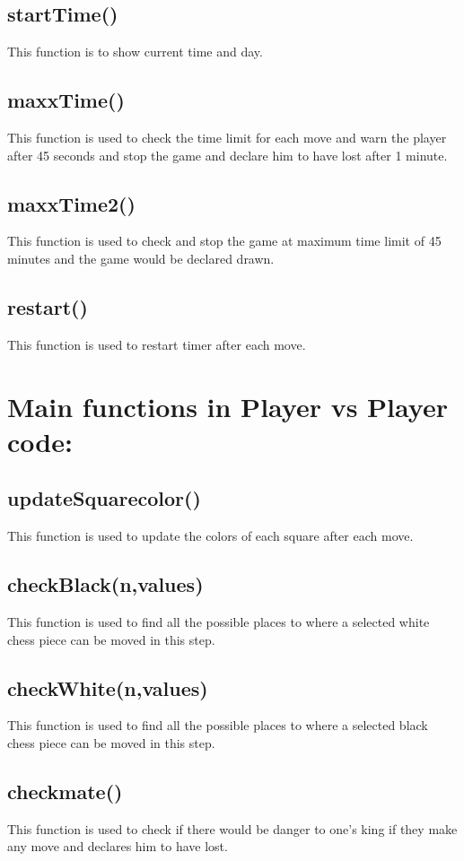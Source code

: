 \documentclass{article}
\begin{document}
\subsection{startTime()}
This function is to show current time and day.
\subsection{maxxTime()}This function is used to check the time limit for each move and warn the player after 45 seconds and stop the game and declare him to have lost after 1 minute.
\subsection{maxxTime2()}This function is used to check and stop the game at maximum time limit of 45 minutes and the game would be declared drawn.
\subsection{restart()}This function is used to restart timer after each move. \\





\section{Main functions in Player vs Player code:}
\subsection{updateSquarecolor()}This function is used to update the colors of each square after each move.
\subsection{checkBlack(n,values)}This function is used to find all the possible places to where a selected white chess piece can be moved in this step.
\subsection{checkWhite(n,values)}This function is used to find all the possible places to where a selected black chess piece can be moved in this step.
\subsection{checkmate()}This function is used to check if there would be danger to one's king if they make any move and declares him to have lost.
\end{document}
